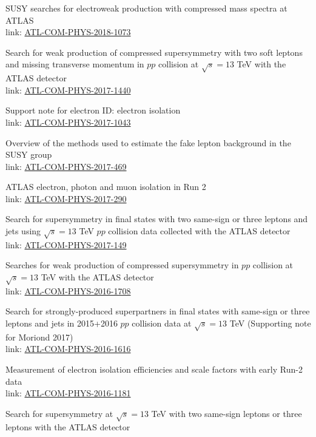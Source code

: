 \documentclass[letterpaper]{deedy-resume-openfont}
\begin{document}
\location{}
\begin{tightemize}
\item SUSY searches for electroweak production with compressed mass spectra at ATLAS\\
      link: \href{https://cds.cern.ch/record/2631591}{ATL-COM-PHYS-2018-1073}
\item Search for weak production of compressed supersymmetry with two soft leptons and missing transverse momentum in $pp$ collision at $\sqrt{s} = 13$ TeV with the ATLAS detector\\
      link: \href{https://cds.cern.ch/record/2284973}{ATL-COM-PHYS-2017-1440}
\item Support note for electron ID: electron isolation\\
      link: \href{https://cds.cern.ch/record/2274466}{ATL-COM-PHYS-2017-1043}
\item Overview of the methods used to estimate the fake lepton background in the SUSY group\\
      link: \href{https://cds.cern.ch/record/2261709}{ATL-COM-PHYS-2017-469}
\item ATLAS electron, photon and muon isolation in Run 2\\
      link: \href{https://cds.cern.ch/record/2256658}{ATL-COM-PHYS-2017-290}
\item Search for supersymmetry in final states with two same-sign or three leptons and jets using $\sqrt{s} = 13$ TeV $pp$ collision data collected with the ATLAS detector\\
      link: \href{https://cds.cern.ch/record/2252643}{ATL-COM-PHYS-2017-149}
\item Searches for weak production of compressed supersymmetry in $pp$ collision at $\sqrt{s} = 13$ TeV with the ATLAS detector\\
      link: \href{https://cds.cern.ch/record/2235272}{ATL-COM-PHYS-2016-1708}
\item Search for strongly-produced superpartners in final states with same-sign or three leptons and jets in 2015+2016 $pp$ collision data at $\sqrt{s} = 13$ TeV (Supporting note for Moriond 2017)\\
      link: \href{https://cds.cern.ch/record/2231789}{ATL-COM-PHYS-2016-1616}
\item Measurement of electron isolation efficiencies and scale factors with early Run-2 data\\
      link: \href{https://cds.cern.ch/record/2209586}{ATL-COM-PHYS-2016-1181}
\item Search for supersymmetry at $\sqrt{s} = 13$ TeV with two same-sign leptons or three leptons with the ATLAS detector\\

\end{tightemize}
\end{document}

